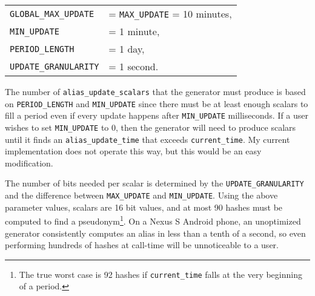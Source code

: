 \documentclass[11pt]{article}
\begin{document}
\begin{center}
\begin{tabular} { l  l }
	\texttt{GLOBAL_MAX_UPDATE} &= \texttt{MAX_UPDATE} = 10 minutes, \\
	\texttt{MIN_UPDATE} &= 1 minute, \\
	\texttt{PERIOD_LENGTH} &= 1 day, \\
	\texttt{UPDATE_GRANULARITY} &= 1 second.
\end{tabular}
\end{center}

The number of \texttt{alias_update_scalars} that the generator must produce is based on \texttt{PERIOD_LENGTH} and \texttt{MIN_UPDATE} since there must be at least enough scalars to fill a period even if every update happens after \texttt{MIN_UPDATE} milliseconds. If a user wishes to set \texttt{MIN_UPDATE} to 0, then the generator will need to produce scalars until it finds an \texttt{alias_update_time} that exceeds \texttt{current_time}. My current implementation does not operate this way, but this would be an easy modification. 

The number of bits needed per scalar is determined by the \texttt{UPDATE_GRANULARITY} and the difference between \texttt{MAX_UPDATE} and \texttt{MIN_UPDATE}. Using the above parameter values, scalars are 16 bit values, and at most 90 hashes must be computed to find a pseudonym\footnote{The true worst case is 92 hashes if \texttt{current_time} falls at the very beginning of a period.}. On a Nexus S Android phone, an unoptimized generator consistently computes an alias in less than a tenth of a second, so even performing hundreds of hashes at call-time will be unnoticeable to a user.
\end{document}
